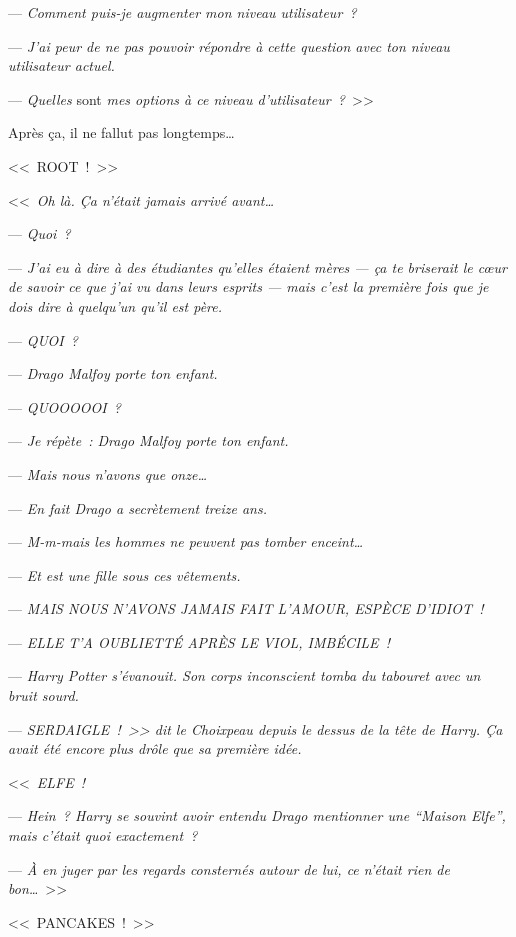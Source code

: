 --- \emph{Comment puis-je augmenter mon niveau utilisateur~?}

--- \emph{J'ai peur de ne pas pouvoir répondre à cette question avec ton niveau utilisateur actuel.}

--- \emph{Quelles} sont \emph{mes options à ce niveau d'utilisateur~?}~>>

Après ça, il ne fallut pas longtemps…

<<~ROOT~!~>>

\later

<<~\emph{Oh là. Ça n'était jamais arrivé avant…}

--- \emph{Quoi~?}

--- \emph{J'ai eu à dire à des étudiantes qu'elles étaient mères — ça te briserait le cœur de savoir ce que j'ai vu dans leurs esprits — mais c'est la première fois que je dois dire à quelqu'un qu'il est père.}

--- \emph{QUOI~?}

--- \emph{Drago Malfoy porte ton enfant.}

--- \emph{QUOOOOOI~?}

--- \emph{Je répète~: Drago Malfoy porte ton enfant.}

--- \emph{Mais nous n'avons que onze…}

--- \emph{En fait Drago a secrètement treize ans.}

--- \emph{M-m-mais les hommes ne peuvent pas tomber enceint…}

--- \emph{Et est une fille sous ces vêtements.}

--- \emph{MAIS NOUS N'AVONS JAMAIS FAIT L'AMOUR, ESPÈCE D'IDIOT~!}

--- \emph{ELLE T'A OUBLIETTÉ APRÈS LE VIOL, IMBÉCILE~!}

--- \emph{Harry Potter s'évanouit. Son corps inconscient tomba du tabouret avec un bruit sourd.}

--- \emph{SERDAIGLE~!~>> dit le Choixpeau depuis le dessus de la tête de Harry. Ça avait été encore plus drôle que sa première idée.}

\later

<<~\emph{ELFE~!}

--- \emph{Hein~? Harry se souvint avoir entendu Drago mentionner une “Maison Elfe”, mais c'était quoi exactement~?}

--- \emph{À en juger par les regards consternés autour de lui, ce n'était rien de bon…}~>>

\later

<<~PANCAKES~!~>>

